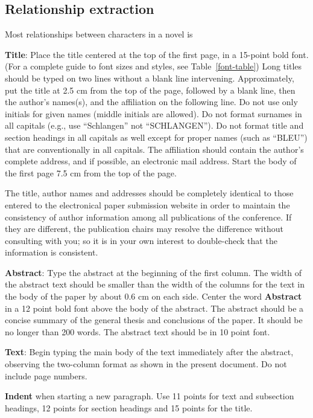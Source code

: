 \documentclass[11pt]{article}
\begin{document}
\subsection{Relationship extraction} %
\label{ssec:first}

Most relationships between characters in a novel is 

{\bf Title}: Place the title centered at the top of the first page, in
a 15-point bold font. (For a complete guide to font sizes and styles,
see Table~\ref{font-table}) Long titles should be typed on two lines
without a blank line intervening. Approximately, put the title at 2.5
cm from the top of the page, followed by a blank line, then the
author's names(s), and the affiliation on the following line. Do not
use only initials for given names (middle initials are allowed). Do
not format surnames in all capitals (e.g., use ``Schlangen'' not
``SCHLANGEN'').  Do not format title and section headings in all
capitals as well except for proper names (such as ``BLEU'') that are
conventionally in all capitals.  The affiliation should contain the
author's complete address, and if possible, an electronic mail
address. Start the body of the first page 7.5 cm from the top of the
page.

The title, author names and addresses should be completely identical
to those entered to the electronical paper submission website in order
to maintain the consistency of author information among all
publications of the conference. If they are different, the publication
chairs may resolve the difference without consulting with you; so it
is in your own interest to double-check that the information is
consistent.

{\bf Abstract}: Type the abstract at the beginning of the first
column. The width of the abstract text should be smaller than the
width of the columns for the text in the body of the paper by about
0.6 cm on each side. Center the word {\bf Abstract} in a 12 point bold
font above the body of the abstract. The abstract should be a concise
summary of the general thesis and conclusions of the paper. It should
be no longer than 200 words. The abstract text should be in 10 point font.

{\bf Text}: Begin typing the main body of the text immediately after
the abstract, observing the two-column format as shown in 
the present document. Do not include page numbers.

{\bf Indent} when starting a new paragraph. Use 11 points for text and 
subsection headings, 12 points for section headings and 15 points for
the title. 
\end{document}

